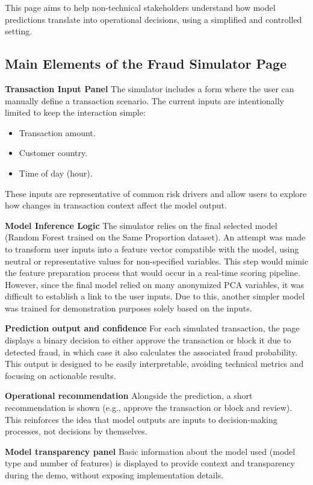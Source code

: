 \documentclass[12pt,a4paper]{report}
\begin{document}
This page aims to help non-technical stakeholders understand how model predictions translate into operational decisions, using a simplified and controlled setting.

\subsection{Main Elements of the Fraud Simulator Page}

\textbf{Transaction Input Panel}  
The simulator includes a form where the user can manually define a transaction scenario. The current inputs are intentionally limited to keep the interaction simple:
\begin{itemize}
    \item Transaction amount.
    \item Customer country.
    \item Time of day (hour).
\end{itemize}
These inputs are representative of common risk drivers and allow users to explore how changes in transaction context affect the model output.

\textbf{Model Inference Logic}  
The simulator relies on the final selected model (Random Forest trained on the Same Proportion dataset). An attempt was made to transform user inputs into a feature vector compatible with the model, using neutral or representative values for non-specified variables. This step would mimic the feature preparation process that would occur in a real-time scoring pipeline. However, since the final model relied on many anonymized PCA variables, it was difficult to establish a link to the user inputs. Due to this, another simpler model was trained for demonstration purposes solely based on the inputs.

\textbf{Prediction output and confidence}  
For each simulated transaction, the page displays a binary decision to either approve the transaction or block it due to detected fraud, in which case it also calculates the associated fraud probability. This output is designed to be easily interpretable, avoiding technical metrics and focusing on actionable results.

\textbf{Operational recommendation}  
Alongside the prediction, a short recommendation is shown (e.g., approve the transaction or block and review). This reinforces the idea that model outputs are inputs to decision-making processes, not decisions by themselves.

\textbf{Model transparency panel}  
Basic information about the model used (model type and number of features) is displayed to provide context and transparency during the demo, without exposing implementation details.
\end{document}

